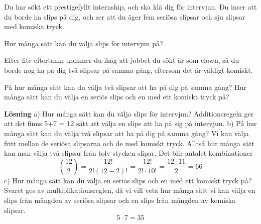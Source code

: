 \documentclass{tufte-handout}
\begin{document}
\begin{xca}
	Du har sökt ett prestigefyllt internship, och ska klä dig för intervjun. Du inser att du borde ha slips på dig, och ser att du äger fem seriösa slipsar och sju slipsar med komiska tryck.
  
	Hur många sätt kan du välja slips för intervjun på?
  
	Efter lite eftertanke kommer du ihåg att jobbet du sökt är som clown, så du borde nog ha på dig två slipsar på samma gång, eftersom det är väldigt komiskt.

	På hur många sätt kan du välja två slipsar att ha på dig på samma gång? Hur många sätt kan du välja en seriös slips och en med ett komiskt tryck på?
  \end{xca}
  
  \noindent\textbf{Lösning}
    \newline a) Hur många sätt kan du välja slips för intervjun?
    \newline Additionsregeln ger att det finns 5+7 = 12 sätt att välja en slips att ha på sig på intervjun.
    \newline b) På hur många sätt kan du välja två slipsar att ha på dig på samma gång?
    Vi kan välja fritt mellan de seriösa slipsarna och de med komiskt tryck.
    Alltså hur många sätt kan man välja två slipsar från tolv stycken slipar.
    Det blir antalet kombinationer $$\binom{12}{2} = \frac{12!}{2!(12-2)!} = \frac{12!}{2!\cdot 10!} = \frac{12\cdot 11}{2} = 66$$
    \newline c) Hur många sätt kan du välja en seriös slips och en med ett komiskt tryck på?
    \newline Svaret ges av multiplikationsreglen, då vi vill veta hur många sätt vi kan välja en slips från mängden av seriösa slipsar och en slips från mängden av komiska slipsar.
    $$5\cdot 7 = 35$$



\end{document}
